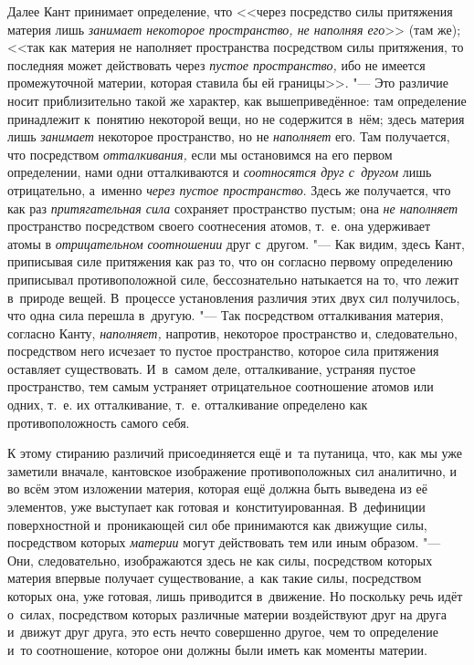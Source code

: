 Далее Кант принимает определение, что <<через посредство силы притяжения
материя лишь {\em занимает некоторое пространство, не
наполняя его}>> (там же); <<так как материя не наполняет пространства
посредством силы притяжения, то последняя может действовать через
{\em пустое пространство,} ибо не имеется промежуточной
материи, которая ставила бы ей границы>>. "--- Это различие носит
приблизительно такой же характер, как вышеприведённое: там определение
принадлежит к~понятию некоторой вещи, но не содержится в~нём; здесь материя
лишь {\em занимает} некоторое пространство, но не
{\em наполняет} его. Там получается, что посредством
{\em отталкивания,} если мы остановимся на его первом
определении, нами одни отталкиваются и {\em соотносятся
друг с~другом} лишь отрицательно, а~именно {\em через
пустое пространство}. Здесь же получается, что как раз
{\em притягательная сила} сохраняет пространство
пустым; она {\em не наполняет} пространство посредством
своего соотнесения атомов, т.~е. она удерживает атомы в {\em отрицательном}
{\em соотношении} друг с~другом. "--- Как видим, здесь
Кант, приписывая силе притяжения как раз то, что он согласно первому
определению приписывал противоположной силе, бессознательно натыкается на
то, что лежит в~природе вещей. В~процессе установления различия этих двух
сил получилось, что одна сила перешла в~другую. "--- Так посредством
отталкивания материя, согласно Канту, {\em наполняет,}
напротив, некоторое пространство и, следовательно, посредством него
исчезает то пустое пространство, которое сила притяжения оставляет
существовать. И~в~самом деле, отталкивание, устраняя пустое пространство,
тем самым устраняет отрицательное соотношение атомов или одних, т.~е. их
отталкивание, т.~е. отталкивание определено как противоположность самого себя.

К этому стиранию различий присоединяется ещё и~та путаница, что, как мы уже
заметили вначале, кантовское изображение противоположных сил аналитично, и
во всём этом изложении материя, которая ещё должна быть выведена из её
элементов, уже выступает как готовая и~конституированная. В~дефиниции
поверхностной и~проникающей сил обе принимаются как движущие силы,
посредством которых {\em материи} могут действовать тем
или иным образом. "--- Они, следовательно, изображаются здесь не как силы,
посредством которых материя впервые получает существование, а~как такие
силы, посредством которых она, уже готовая, лишь приводится в~движение. Но
поскольку речь идёт о~силах, посредством которых различные материи
воздействуют друг на друга и~движут друг друга, это есть нечто совершенно
другое, чем то определение и~то соотношение, которое они должны были иметь
как моменты материи.

